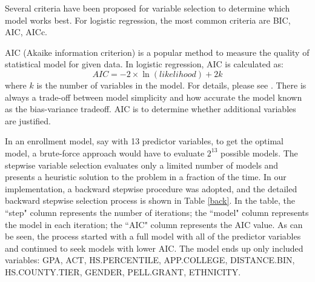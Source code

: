 \documentclass[12pt,english]{report}
\begin{document}
Several criteria have been proposed for variable selection to determine which
model works best.
For logistic regression, the most common criteria are BIC, AIC, AICc.  

AIC (Akaike information criterion) is a popular method to measure the quality
of statistical
model for given data. In logistic regression, AIC is calculated as:
\begin{equation}
    AIC= -2 \times \ln(likelihood) + 2k
\end{equation}
where $k$ is the number of variables in the model. For details, please see 
\citep{wagenmakers2004aic}. There is always a trade-off between model
simplicity and how
accurate the model known as the bias-variance tradeoff. AIC is to determine
whether
additional variables are justified.
     
In an enrollment model, say with 13 predictor variables, to get the optimal
model, a 
brute-force approach would have to evaluate $2^{13}$ possible models. The
stepwise variable
selection evaluates only a limited number of models and presents a heuristic
solution to the
problem in a fraction of the time. In our implementation, a backward stepwise
procedure was 
adopted, and the detailed backward stepwise selection process is shown in Table
\ref{back}.
In the table, the ``step" column represents the number of iterations; the
``model" column represents
the model in each iteration; the ``AIC" column represents the AIC value.  As
can be seen, the process
started with a full model with all of the predictor variables and continued to
seek models with 
lower AIC.  The model ends up only included variables: GPA, ACT, HS.PERCENTILE,
APP.COLLEGE, 
DISTANCE.BIN, HS.COUNTY.TIER, GENDER, PELL.GRANT, ETHNICITY.

\end{document}
